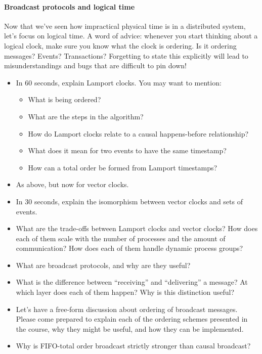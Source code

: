 \documentclass[12pt,a4paper,oneside,openright]{report}
\newcommand{\question}[2]{\paragraph{#1} #2}
\begin{document}
\question{Broadcast protocols and logical time}{Now that we've seen
  how impractical physical time is in a distributed system, let's
  focus on logical time. A word of advice: whenever you start thinking
  about a logical clock, make sure you know what the clock is
  ordering. Is it ordering messages? Events? Transactions? Forgetting
  to state this explicitly will lead to misunderstandings and bugs
  that are difficult to pin down!
  \begin{itemize}
  \item In 60 seconds, explain Lamport clocks. You may want to
    mention:
    \begin{itemize}
    \item What is being ordered?
    \item What are the steps in the algorithm?
    \item How do Lamport clocks relate to a causal happens-before
      relationship?
    \item What does it mean for two events to have the same timestamp?
    \item How can a total order be formed from Lamport timestamps?
    \end{itemize}
  \item As above, but now for vector clocks.
  \item In 30 seconds, explain the isomorphism between vector clocks
    and sets of events.
  \item What are the trade-offs between Lamport clocks and vector
    clocks? How does each of them scale with the number of processes
    and the amount of communication? How does each of them handle
    dynamic process groups?
  \item What are broadcast protocols, and why are they useful?
  \item What is the difference between ``receiving'' and
    ``delivering'' a message? At which layer does each of them happen?
    Why is this distinction useful?
  \item Let's have a free-form discussion about ordering of broadcast
    messages. Please come prepared to explain each of the ordering
    schemes presented in the course, why they might be useful, and how
    they can be implemented.
  \item Why is FIFO-total order broadcast strictly stronger than
    causal broadcast?
  \end{itemize}
}
\end{document}
